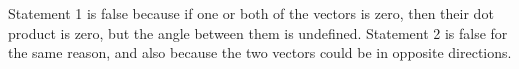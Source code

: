 Statement 1 is false because if one or both of the vectors is zero, then their dot product is
zero, but the angle between them is undefined. Statement 2 is false for the same reason, and
also because the two vectors could be in opposite directions.
